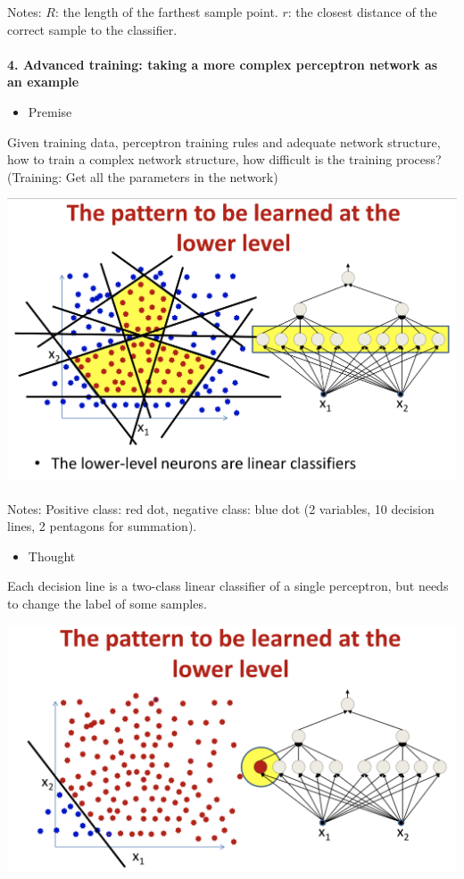 \documentclass{article}
\begin{document}
	Notes: $R$: the length of the farthest sample point. $r$: the closest distance of the correct sample to the classifier. \\ \\
	
	\textbf{4. Advanced training: taking a more complex perceptron network as an example}
	
	\begin{itemize}
		\item Premise
	\end{itemize}
	
	Given training data, perceptron training rules and adequate network structure, how to train a complex network structure, how difficult is the training process? (Training: Get all the parameters in the network)
	
	\includegraphics[scale=0.2]{51.png}
	
	Notes: Positive class: red dot, negative class: blue dot (2 variables, 10 decision lines, 2 pentagons for summation).
	
	\begin{itemize}
		\item Thought
	\end{itemize}
	
	Each decision line is a two-class linear classifier of a single perceptron, but needs to change the label of some samples.
	
	\includegraphics[scale=0.2]{52.png}
	
\end{document}
